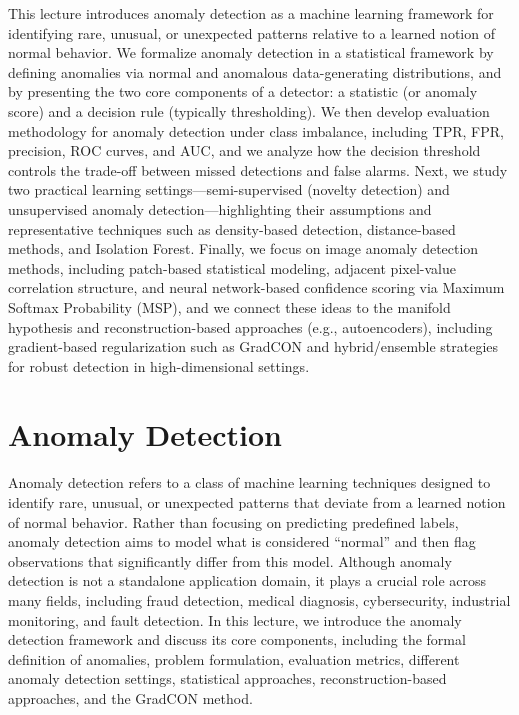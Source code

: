 \documentclass{article}
\begin{document}
This lecture introduces anomaly detection as a machine learning framework for identifying rare, unusual, or unexpected patterns relative to a learned notion of normal behavior. We formalize anomaly detection in a statistical framework by defining anomalies via normal and anomalous data-generating distributions, and by presenting the two core components of a detector: a statistic (or anomaly score) and a decision rule (typically thresholding). We then develop evaluation methodology for anomaly detection under class imbalance, including TPR, FPR, precision, ROC curves, and AUC, and we analyze how the decision threshold controls the trade-off between missed detections and false alarms. Next, we study two practical learning settings---semi-supervised (novelty detection) and unsupervised anomaly detection---highlighting their assumptions and representative techniques such as density-based detection, distance-based methods, and Isolation Forest. Finally, we focus on image anomaly detection methods, including patch-based statistical modeling, adjacent pixel-value correlation structure, and neural network-based confidence scoring via Maximum Softmax Probability (MSP), and we connect these ideas to the manifold hypothesis and reconstruction-based approaches (e.g., autoencoders), including gradient-based regularization such as GradCON and hybrid/ensemble strategies for robust detection in high-dimensional settings.

\section{Anomaly Detection}

Anomaly detection refers to a class of machine learning techniques designed to identify rare, unusual, or unexpected patterns that deviate from a learned notion of normal behavior. Rather than focusing on predicting predefined labels, anomaly detection aims to model what is considered “normal” and then flag observations that significantly differ from this model. Although anomaly detection is not a standalone application domain, it plays a crucial role across many fields, including fraud detection, medical diagnosis, cybersecurity, industrial monitoring, and fault detection. In this lecture, we introduce the anomaly detection framework and discuss its core components, including the formal definition of anomalies, problem formulation, evaluation metrics, different anomaly detection settings, statistical approaches, reconstruction-based approaches, and the GradCON method.
\end{document}
